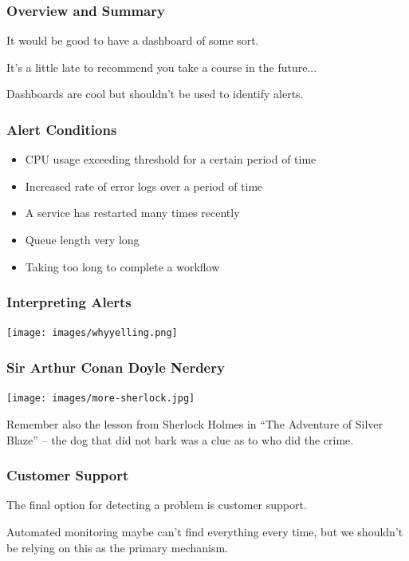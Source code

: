 \begin{frame}
\frametitle{Overview and Summary}

It would be good to have a dashboard of some sort.

It's a little late to recommend you take a course in the future...

Dashboards are cool but shouldn't be used to identify alerts.

\end{frame}


\begin{frame}
\frametitle{Alert Conditions}

\begin{itemize}
	\item CPU usage exceeding threshold for a certain period of time
	\item Increased rate of error logs over a period of time
	\item A service has restarted many times recently
	\item Queue length very long
	\item Taking too long to complete a workflow
\end{itemize}

\end{frame}


\begin{frame}
\frametitle{Interpreting Alerts}

\begin{center}
	\texttt{[image: images/whyyelling.png]}
\end{center}


\end{frame}




\begin{frame}
\frametitle{Sir Arthur Conan Doyle Nerdery}

\begin{center}
	\texttt{[image: images/more-sherlock.jpg]}
\end{center}

Remember also the lesson from Sherlock Holmes in ``The Adventure of Silver Blaze'' -- the dog that did \alert{not} bark was a clue as to who did the crime.

\end{frame}


\begin{frame}
\frametitle{Customer Support}

The final option for detecting a problem is customer support.

Automated monitoring maybe can't find everything every time, but we shouldn't be relying on this as the primary mechanism.


\end{frame}



